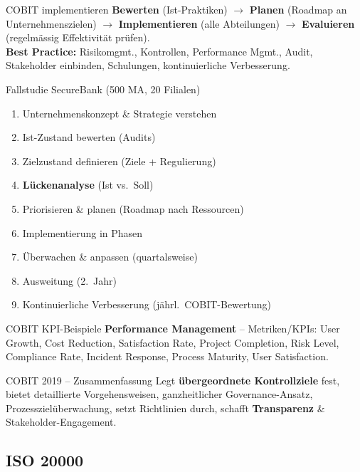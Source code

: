 \documentclass[a4paper, fontsize=7pt]{scrartcl}
\begin{document}
\begin{mainbox}{COBIT implementieren}
\textbf{Bewerten} (Ist-Praktiken) $\to$ \textbf{Planen} (Roadmap an
Unternehmenszielen) $\to$ \textbf{Implementieren} (alle Abteilungen) $\to$
\textbf{Evaluieren} (regelmässig Effektivität prüfen).\\
\textbf{Best Practice:} Risikomgmt., Kontrollen, Performance Mgmt., Audit,
Stakeholder einbinden, Schulungen, kontinuierliche Verbesserung.
\end{mainbox}

\begin{subbox}{Fallstudie SecureBank (500 MA, 20 Filialen)}
\begin{enumerate}
    \item Unternehmenskonzept \& Strategie verstehen
    \item Ist-Zustand bewerten (Audits)
    \item Zielzustand definieren (Ziele + Regulierung)
    \item \textbf{Lückenanalyse} (Ist vs.\ Soll)
    \item Priorisieren \& planen (Roadmap nach Ressourcen)
    \item Implementierung in Phasen
    \item Überwachen \& anpassen (quartalsweise)
    \item Ausweitung (2.\ Jahr)
    \item Kontinuierliche Verbesserung (jährl.\ COBIT-Bewertung)
\end{enumerate}
\end{subbox}

\begin{subbox}{COBIT KPI-Beispiele}
\textbf{Performance Management} -- Metriken/KPIs:
User Growth, Cost Reduction, Satisfaction Rate, Project Completion, Risk
Level, Compliance Rate, Incident Response, Process Maturity, User
Satisfaction.
\end{subbox}

\begin{mainbox}{COBIT 2019 -- Zusammenfassung}
Legt \textbf{übergeordnete Kontrollziele} fest, bietet detaillierte
Vorgehensweisen, ganzheitlicher Governance-Ansatz, Prozesszielüberwachung,
setzt Richtlinien durch, schafft \textbf{Transparenz} \&
Stakeholder-Engagement.
\end{mainbox}

\subsection{ISO 20000}
\end{document}
